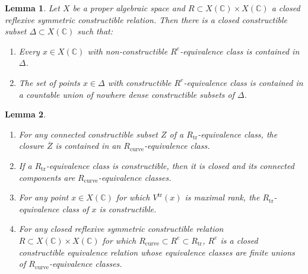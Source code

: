 \documentclass[10pt,a4paper]{amsart}
\newtheorem{lem}{Lemma}
\def\bC{\mathbb{C}}
\renewcommand{\bar}[1]{\ol{#1}}
\newcommand{\ol}{\overline}
\def\trans{\mathrm{tr}}
\begin{document}
\begin{lem}\label{lem:equiv reln}Let $X$ be a proper algebraic space and $R\subset X(\bC)\times X(\bC)$ a closed reflexive symmetric constructible relation.  Then there is a closed constructible subset $\Delta\subset X(\bC)$ such that: 
\begin{enumerate}
\item Every $x\in X(\bC)$ with non-constructible $R^e$-equivalence class is contained in $\Delta$.
\item The set of points $x\in \Delta$ with constructible $R^e$-equivalence class is contained in a countable union of nowhere dense constructible subsets of $\Delta$.
\end{enumerate}

\end{lem}

\begin{lem}\label{lem:equiv reln stuff}\hspace{.5in}
\begin{enumerate}
\item\label{lem:equiv reln stuff p0} For any connected constructible subset $Z$ of a $R_\trans$-equivalence class, the closure $\bar Z$ is contained in an $R_\mathrm{curve}$-equivalence class.  
\item\label{lem:equiv reln stuff p1} If a $R_\trans$-equivalence class is constructible, then it is closed and its connected components are $R_\mathrm{curve}$-equivalence classes.  
\item\label{lem:equiv reln stuff p2} For any point $x\in X(\bC)$ for which $V^\trans(x)$ is maximal rank, the $R_\trans$-equivalence class of $x$ is constructible.
\item\label{lem:equiv reln stuff p3} For any closed reflexive symmetric constructible relation $R\subset X(\bC)\times X(\bC)$ for which $R_\mathrm{curve}\subset R^e\subset R_\trans$, $R^e$ is a closed constructible equivalence relation whose equivalence classes are finite unions of $R_\mathrm{curve}$-equivalence classes.
\end{enumerate}
\end{lem}
\end{document}
